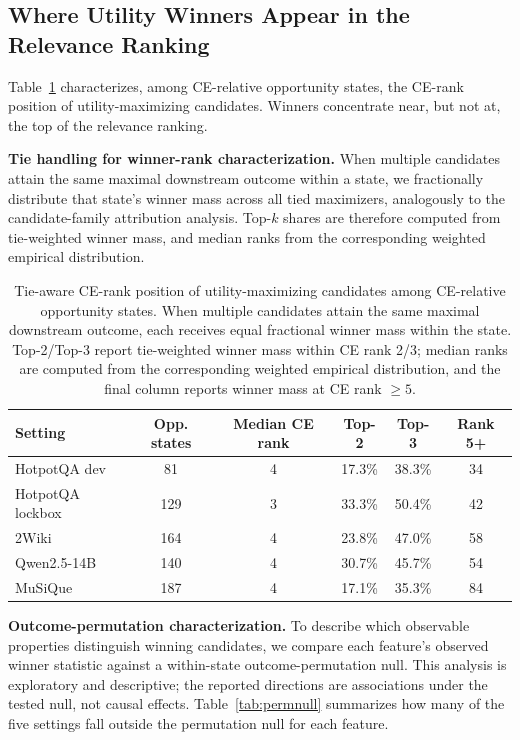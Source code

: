 \documentclass[10pt]{article}
\newcommand{\stitle}[1]{\vspace{0.4em}\noindent\textbf{#1}\hspace{0.6em}}
\begin{document}
\subsection{Where Utility Winners Appear in the Relevance Ranking}
\label{sec:winnerrank}

Table~\ref{tab:winnerrank} characterizes, among CE-relative opportunity
states, the CE-rank position of utility-maximizing candidates. Winners
concentrate near, but not at, the top of the relevance ranking.

\stitle{Tie handling for winner-rank characterization.}
When multiple candidates attain the same maximal downstream outcome within a
state, we fractionally distribute that state's winner mass across all tied
maximizers, analogously to the candidate-family attribution analysis. Top-$k$
shares are therefore computed from tie-weighted winner mass, and median ranks
from the corresponding weighted empirical distribution.

\begin{table}[h]
\centering
\small
\caption{Tie-aware CE-rank position of utility-maximizing candidates among
CE-relative opportunity states. When multiple candidates attain the same
maximal downstream outcome, each receives equal fractional winner mass within
the state. Top-2/Top-3 report tie-weighted winner mass within CE rank 2/3;
median ranks are computed from the corresponding weighted empirical
distribution, and the final column reports winner mass at CE rank $\ge5$.}
\label{tab:winnerrank}
\begin{tabular}{lccccc}
\toprule
\textbf{Setting} & \textbf{Opp. states} & \textbf{Median CE rank} &
\textbf{Top-2} & \textbf{Top-3} & \textbf{Rank 5+} \\
\midrule
HotpotQA dev     & 81  & 4 & 17.3\% & 38.3\% & 34 \\
HotpotQA lockbox & 129 & 3 & 33.3\% & 50.4\% & 42 \\
2Wiki            & 164 & 4 & 23.8\% & 47.0\% & 58 \\
Qwen2.5-14B      & 140 & 4 & 30.7\% & 45.7\% & 54 \\
MuSiQue          & 187 & 4 & 17.1\% & 35.3\% & 84 \\
\bottomrule
\end{tabular}
\end{table}

\stitle{Outcome-permutation characterization.}
To describe which observable properties distinguish winning candidates, we
compare each feature's observed winner statistic against a within-state
outcome-permutation null. This analysis is exploratory and descriptive; the
reported directions are associations under the tested null, not causal
effects. Table~\ref{tab:permnull} summarizes how many of the five settings
fall outside the permutation null for each feature.
\end{document}
